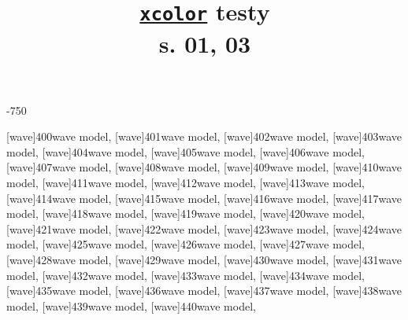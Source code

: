 \documentclass[a4paper,11pt]{article}
\title{\href{https://repo.skni.umcs.pl/ctan/macros/latex/contrib/xcolor/xcolor.pdf}{\texttt{xcolor}} testy \\
  s. 01, 03}
\author{}
\begin{document}





\maketitle %





-750

\noindent
{}[wave]{400}{wave model},
[wave]{401}{wave model},
[wave]{402}{wave model},
[wave]{403}{wave model},
[wave]{404}{wave model},
[wave]{405}{wave model},
[wave]{406}{wave model}, \\[0.7em]
[wave]{407}{wave model},
[wave]{408}{wave model},
[wave]{409}{wave model},
[wave]{410}{wave model},
[wave]{411}{wave model},
[wave]{412}{wave model},
[wave]{413}{wave model}, \\[0.7em]
[wave]{414}{wave model},
[wave]{415}{wave model},
[wave]{416}{wave model},
[wave]{417}{wave model},
[wave]{418}{wave model},
[wave]{419}{wave model},
[wave]{420}{wave model}, \\[0.7em]
[wave]{421}{wave model},
[wave]{422}{wave model},
[wave]{423}{wave model},
[wave]{424}{wave model},
[wave]{425}{wave model},
[wave]{426}{wave model},
[wave]{427}{wave model}, \\[0.7em]
[wave]{428}{wave model},
[wave]{429}{wave model},
[wave]{430}{wave model},
[wave]{431}{wave model},
[wave]{432}{wave model},
[wave]{433}{wave model},
[wave]{434}{wave model}, \\[0.7em]
[wave]{435}{wave model},
[wave]{436}{wave model},
[wave]{437}{wave model},
[wave]{438}{wave model},
[wave]{439}{wave model},
[wave]{440}{wave model},
\end{document}
